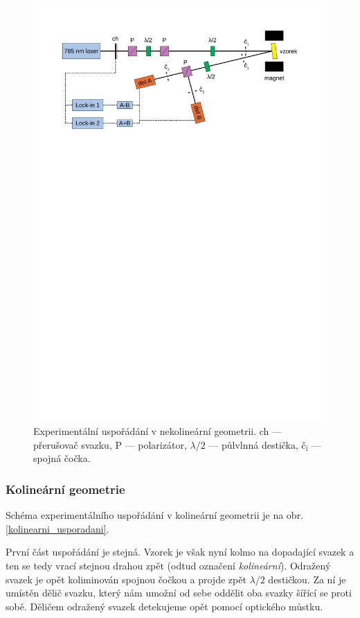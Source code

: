\begin{figure}[htbp]\centering
	\includegraphics[trim={0,7in 8in 0,7in 0.5in}, clip, width=\textwidth]{./png/nekolinearni_usporadani}
	\caption{Experimentální uspořádání v nekolineární geometrii. ch --- přerušovač svazku, P --- polarizátor, $\lambda/2$ --- půlvlnná destička, č$_\text{i}$ --- spojná čočka.}\label{nekolinearni_usporadani}
\end{figure}

\FloatBarrier

\subsubsection*{Kolineární geometrie}
Schéma experimentálního uspořádání v kolineární geometrii je na obr. \ref{kolinearni_usporadani}.

První část uspořádání je stejná. Vzorek je však nyní kolmo na dopadající svazek a ten se tedy vrací stejnou drahou zpět (odtud označení \emph{kolineární}). Odražený svazek je opět koliminován spojnou čočkou a projde zpět $\lambda/2$ destičkou. Za ní je umístěn dělič svazku, který nám umožní od sebe oddělit oba svazky šířící se proti sobě.
Děličem odražený svazek detekujeme opět pomocí optického můstku.

